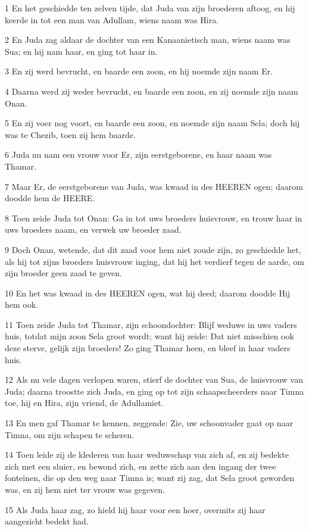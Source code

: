 \par 1 En het geschiedde ten zelven tijde, dat Juda van zijn broederen aftoog, en hij keerde in tot een man van Adullam, wiens naam was Hira.
\par 2 En Juda zag aldaar de dochter van een Kanaanietisch man, wiens naam was Sua; en hij nam haar, en ging tot haar in.
\par 3 En zij werd bevrucht, en baarde een zoon, en hij noemde zijn naam Er.
\par 4 Daarna werd zij weder bevrucht, en baarde een zoon, en zij noemde zijn naam Onan.
\par 5 En zij voer nog voort, en baarde een zoon, en noemde zijn naam Sela; doch hij was te Chezib, toen zij hem baarde.
\par 6 Juda nu nam een vrouw voor Er, zijn eerstgeborene, en haar naam was Thamar.
\par 7 Maar Er, de eerstgeborene van Juda, was kwaad in des HEEREN ogen; daarom doodde hem de HEERE.
\par 8 Toen zeide Juda tot Onan: Ga in tot uws broeders huisvrouw, en trouw haar in uws broeders naam, en verwek uw broeder zaad.
\par 9 Doch Onan, wetende, dat dit zaad voor hem niet zoude zijn, zo geschiedde het, als hij tot zijns broeders huisvrouw inging, dat hij het verdierf tegen de aarde, om zijn broeder geen zaad te geven.
\par 10 En het was kwaad in des HEEREN ogen, wat hij deed; daarom doodde Hij hem ook.
\par 11 Toen zeide Juda tot Thamar, zijn schoondochter: Blijf weduwe in uws vaders huis, totdat mijn zoon Sela groot wordt; want hij zeide: Dat niet misschien ook deze sterve, gelijk zijn broeders! Zo ging Thamar heen, en bleef in haar vaders huis.
\par 12 Als nu vele dagen verlopen waren, stierf de dochter van Sua, de huisvrouw van Juda; daarna troostte zich Juda, en ging op tot zijn schaapscheerders naar Timna toe, hij en Hira, zijn vriend, de Adullamiet.
\par 13 En men gaf Thamar te kennen, zeggende: Zie, uw schoonvader gaat op naar Timna, om zijn schapen te scheren.
\par 14 Toen leide zij de klederen van haar weduwschap van zich af, en zij bedekte zich met een sluier, en bewond zich, en zette zich aan den ingang der twee fonteinen, die op den weg naar Timna is; want zij zag, dat Sela groot geworden was, en zij hem niet ter vrouw was gegeven.
\par 15 Als Juda haar zag, zo hield hij haar voor een hoer, overmits zij haar aangezicht bedekt had.
